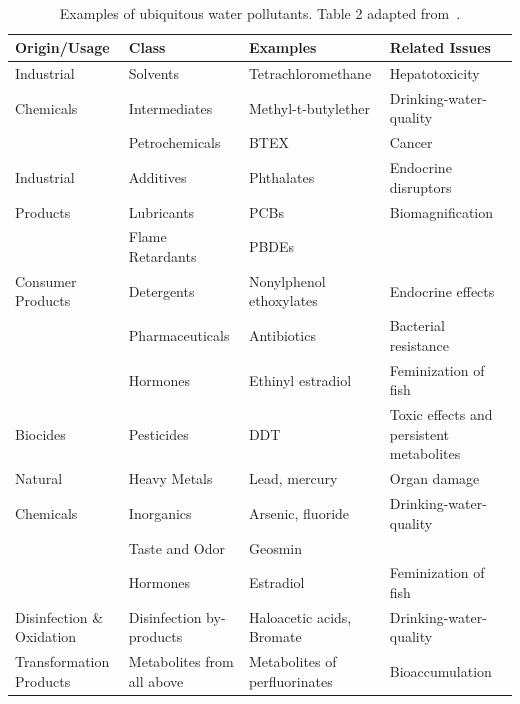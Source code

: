 \begin{table}
    \caption{Examples of ubiquitous water pollutants. Table 2 adapted from~\cite{schwarzenbach2006}.}~\label{tab:ubiquitous_water_pollutants}
    \centering
    \begin{tabular}{>{\raggedright\arraybackslash}p{2.7cm}>{\raggedright\arraybackslash}p{3cm}>{\raggedright\arraybackslash}p{3.4cm}>{\raggedright\arraybackslash}p{4cm}}
    \toprule
    Origin/Usage & Class & Examples & Related Issues \\
    \midrule
    Industrial & Solvents & Tetrachloromethane & Hepatotoxicity \\
    Chemicals & Intermediates & Methyl-t-butylether & Drinking-water-quality \\ 
    & Petrochemicals & BTEX & Cancer \\ 
    \midrule
    Industrial & Additives & Phthalates & Endocrine disruptors \\
    Products & Lubricants & PCBs & Biomagnification \\
     & Flame Retardants & PBDEs & \\ 
    \midrule
    Consumer Products & Detergents & Nonylphenol ethoxylates & Endocrine effects \\
     & Pharmaceuticals & Antibiotics & Bacterial resistance \\
     & Hormones & Ethinyl estradiol & Feminization of fish \\ 
    \midrule
    Biocides & Pesticides & DDT & Toxic effects and persistent metabolites \\
    \midrule
    Natural & Heavy Metals & Lead, mercury & Organ damage \\
    Chemicals & Inorganics & Arsenic, fluoride & Drinking-water-quality \\
     & Taste and Odor & Geosmin & \\
     & Hormones & Estradiol & Feminization of fish \\ 
    \midrule
    Disinfection \& Oxidation & Disinfection by-products & Haloacetic acids, Bromate & Drinking-water-quality \\ 
    \midrule
     Transformation Products & Metabolites from all above & Metabolites of perfluorinates& Bioaccumulation \\
    \bottomrule
    \end{tabular}
\end{table}

